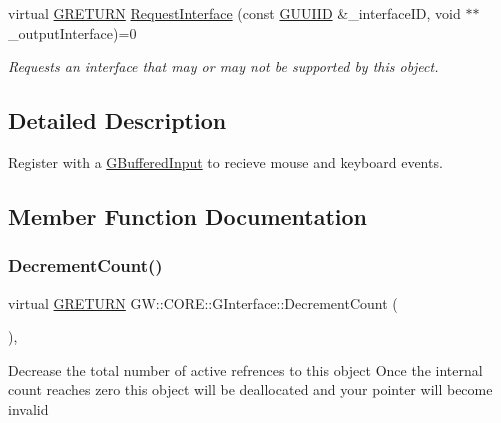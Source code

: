 \begin{DoxyCompactItemize}
\item 
\hypertarget{class_g_w_1_1_c_o_r_e_1_1_g_interface_ab1414aa07bca310a824ee01a91657ad0}{}\label{class_g_w_1_1_c_o_r_e_1_1_g_interface_ab1414aa07bca310a824ee01a91657ad0} 
virtual \hyperlink{namespace_g_w_a69b1aaebac1cac8049825f035884c95b}{G\+R\+E\+T\+U\+RN} \hyperlink{class_g_w_1_1_c_o_r_e_1_1_g_interface_ab1414aa07bca310a824ee01a91657ad0}{Request\+Interface} (const \hyperlink{struct_g_w_1_1_g_u_u_i_i_d}{G\+U\+U\+I\+ID} \&\+\_\+interface\+ID, void $\ast$$\ast$\+\_\+output\+Interface)=0
\begin{DoxyCompactList}\small\item\em Requests an interface that may or may not be supported by this object. \end{DoxyCompactList}\end{DoxyCompactItemize}


\subsection{Detailed Description}
Register with a \hyperlink{class_g_w_1_1_c_o_r_e_1_1_g_buffered_input}{G\+Buffered\+Input} to recieve mouse and keyboard events. 

\subsection{Member Function Documentation}
\hypertarget{class_g_w_1_1_c_o_r_e_1_1_g_interface_af6924e12b14f217b518fc91c63d9703d}{}\label{class_g_w_1_1_c_o_r_e_1_1_g_interface_af6924e12b14f217b518fc91c63d9703d} 
\subsubsection{\texorpdfstring{Decrement\+Count()}{DecrementCount()}}
{\footnotesize\ttfamily virtual \hyperlink{namespace_g_w_a69b1aaebac1cac8049825f035884c95b}{G\+R\+E\+T\+U\+RN} G\+W\+::\+C\+O\+R\+E\+::\+G\+Interface\+::\+Decrement\+Count (\begin{DoxyParamCaption}{ }\end{DoxyParamCaption})\hspace{0.3cm}{\ttfamily [pure virtual]}, {\ttfamily [inherited]}}

Decrease the total number of active refrences to this object Once the internal count reaches zero this object will be deallocated and your pointer will become invalid \hypertarget{class_g_w_1_1_c_o_r_e_1_1_g_interface_a3e04e58eef4f3e3f56ff7fb751194c37}{}\label{class_g_w_1_1_c_o_r_e_1_1_g_interface_a3e04e58eef4f3e3f56ff7fb751194c37} 
